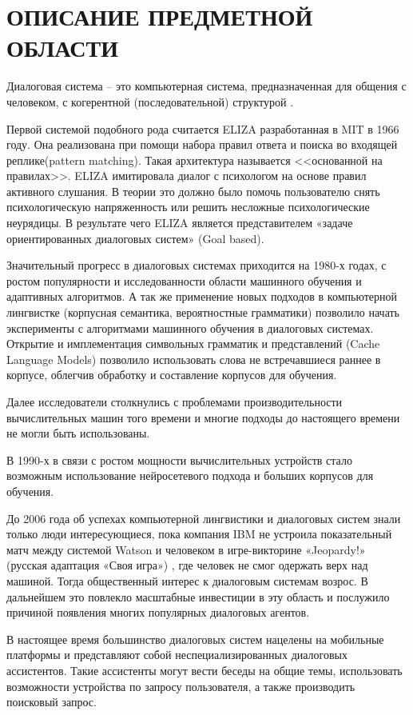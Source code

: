 \chapter{ОПИСАНИЕ ПРЕДМЕТНОЙ ОБЛАСТИ}
Диалоговая система – это компьютерная система, предназначенная для общения с человеком, с когерентной (последовательной) структурой \cite{jurafsky2017dialog}.

Первой системой подобного рода считается ELIZA разработанная в MIT в 1966 году. Она реализована при помощи набора правил ответа и поиска во входящей реплике(pattern matching). Такая архитектура называется  <<основанной на правилах>>. ELIZA имитировала диалог с психологом на основе правил активного слушания. В теории это должно было помочь пользователю снять психологическую напряженность или решить несложные психологические неурядицы.  В результате чего ELIZA является представителем «задаче ориентированных диалоговых систем» (Goal based). 

Значительный прогресс в диалоговых системах приходится на 1980-х годах, с ростом популярности и исследованности области машинного обучения и адаптивных алгоритмов. А так же применение новых подходов в компьютерной лингвистке (корпусная семантика, вероятностные грамматики)  позволило начать эксперименты с  алгоритмами машинного обучения в диалоговых системах. Открытие и имплементация символьных грамматик и представлений (Cache Language Models) \cite{li2018recurrent} позволило использовать слова не встречавшиеся раннее в корпусе, облегчив обработку и составление корпусов для обучения. 

Далее исследователи столкнулись с проблемами производительности вычислительных машин того времени и многие подходы до настоящего времени не могли быть использованы. 

В 1990-х в связи с ростом мощности вычислительных устройств стало возможным использование нейросетевого подхода и больших корпусов для обучения. 

До 2006 года об успехах компьютерной лингвистики и диалоговых систем знали только люди интересующиеся, пока компания IBM не устроила показательный матч между системой Watson и человеком в игре-викторине «Jeopardy!» (русская адаптация «Своя игра») , где человек не смог одержать верх над машиной. Тогда общественный интерес к диалоговым системам возрос. В дальнейшем это повлекло масштабные инвестиции в эту область и послужило причиной появления многих  популярных диалоговых агентов. 

В настоящее время большинство диалоговых систем нацелены на мобильные платформы и представляют собой неспециализированных диалоговых ассистентов. Такие ассистенты могут вести беседы на общие темы, использовать возможности устройства по запросу пользователя, а также производить поисковый запрос. 

